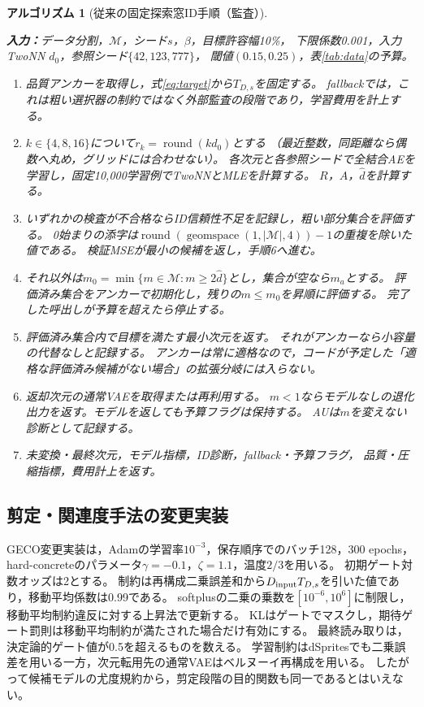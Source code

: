 \documentclass[11pt,a4paper]{ltjsarticle}
\newtheorem{Algorithm}{アルゴリズム}
\begin{document}
\noindent\begin{minipage}{\linewidth}
\begin{Algorithm}[従来の固定探索窓ID手順（監査）]
\label{alg:legacy}\normalfont\small\leavevmode\par\noindent
\textbf{入力：}データ分割，$\mathcal M$，シード$s$，$\beta$，目標許容幅10\%，
下限係数0.001，入力TwoNN $d_0$，参照シード$\{42,123,777\}$，
閾値$(0.15,0.25)$，表\ref{tab:data}の予算。
\begin{enumerate}
\item 品質アンカーを取得し，式\eqref{eq:target}から$T_{D,s}$を固定する。
fallbackでは，これは粗い選択器の制約ではなく外部監査の段階であり，学習費用を計上する。
\item $k\in\{4,8,16\}$について$r_k=\operatorname{round}(kd_0)$とする
（最近整数，同距離なら偶数へ丸め，グリッドには合わせない）。
各次元と各参照シードで全結合AEを学習し，固定10,000学習例でTwoNNとMLEを計算する。
$R$，$A$，$\hat d$を計算する。
\item いずれかの検査が不合格ならID信頼性不足を記録し，粗い部分集合を評価する。
0始まりの添字は$\operatorname{round}(\operatorname{geomspace}(1,|\mathcal M|,4))-1$の重複を除いた値である。
検証MSEが最小の候補を返し，手順6へ進む。
\item それ以外は$m_0=\min\{m\in\mathcal M:m\ge2\hat d\}$とし，集合が空なら$m_a$とする。
評価済み集合をアンカーで初期化し，残りの$m\le m_0$を昇順に評価する。
完了した呼出しが予算を超えたら停止する。
\item 評価済み集合内で目標を満たす最小次元を返す。
それがアンカーなら小容量の代替なしと記録する。
アンカーは常に適格なので，コードが予定した「適格な評価済み候補が\emph{ない}場合」の拡張分岐には入らない。
\item 返却次元の通常VAEを取得または再利用する。
$m<1$ならモデルなしの退化出力を返す。モデルを返しても予算フラグは保持する。
AUは$m$を変えない診断として記録する。
\item 未変換・最終次元，モデル指標，ID診断，fallback・予算フラグ，
品質・圧縮指標，費用計上を返す。
\end{enumerate}
\end{Algorithm}
\end{minipage}

\subsection{剪定・関連度手法の変更実装}\label{app:adaptations}
GECO変更実装は，Adamの学習率$10^{-3}$，保存順序でのバッチ128，300 epochs，
hard-concreteのパラメータ$\gamma=-0.1$，$\zeta=1.1$，温度$2/3$を用いる。
初期ゲート対数オッズは2とする。
制約は再構成二乗誤差和から$D_{\rm input}T_{D,s}$を引いた値であり，移動平均係数は0.99である。
softplusの二乗の乗数を$[10^{-6},10^6]$に制限し，移動平均制約違反に対する上昇法で更新する。
KLはゲートでマスクし，期待ゲート罰則は移動平均制約が満たされた場合だけ有効にする。
最終読み取りは，決定論的ゲート値が0.5を超えるものを数える。
学習制約はdSpritesでも二乗誤差を用いる一方，次元転用先の通常VAEはベルヌーイ再構成を用いる。
したがって候補モデルの尤度規約から，剪定段階の目的関数も同一であるとはいえない。
\end{document}
